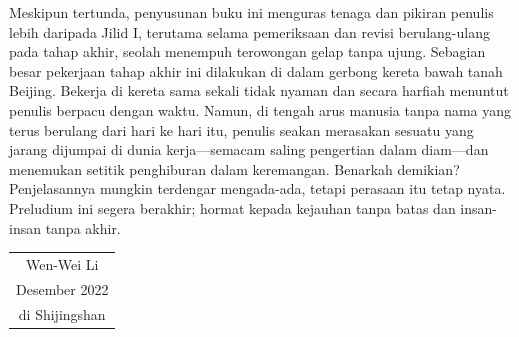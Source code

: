 Meskipun tertunda, penyusunan buku ini menguras tenaga dan pikiran penulis
lebih daripada Jilid I, terutama selama pemeriksaan dan revisi berulang-ulang
pada tahap akhir, seolah menempuh terowongan gelap tanpa ujung. Sebagian besar
pekerjaan tahap akhir ini dilakukan di dalam gerbong kereta bawah tanah
Beijing. Bekerja di kereta sama sekali tidak nyaman dan secara harfiah menuntut
penulis berpacu dengan waktu. Namun, di tengah arus manusia tanpa nama
yang terus berulang dari hari ke hari itu, penulis seakan merasakan sesuatu yang
jarang dijumpai di dunia kerja---semacam saling pengertian dalam diam---dan
menemukan setitik penghiburan dalam keremangan. Benarkah demikian?
Penjelasannya mungkin terdengar mengada-ada, tetapi perasaan itu tetap nyata.
Preludium ini segera berakhir; hormat kepada kejauhan tanpa batas dan insan-insan
tanpa akhir.

\vspace{1em}
\begin{flushright}\begin{minipage}{0.3 \textwidth}
	\begin{tabular}{c}
		{\fangsong Wen-Wei Li} \\
		Desember 2022 \\
		di Shijingshan
	\end{tabular}
\end{minipage}\end{flushright}
